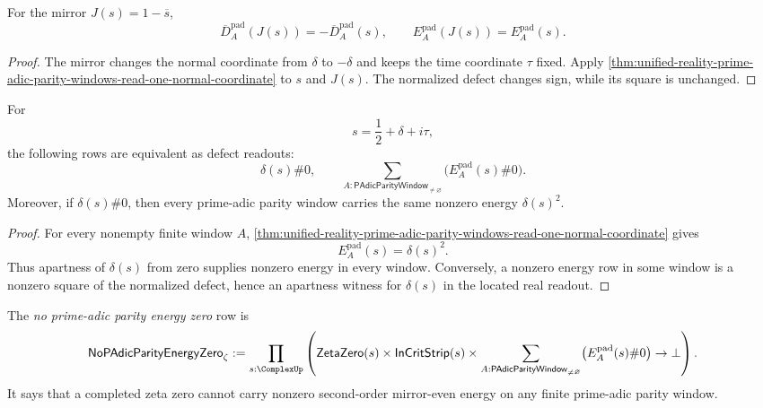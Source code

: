 \begin{corollary}
\label{cor:unified-reality-prime-adic-parity-energy-odd-even}
For the mirror $J(s)=1-\overline{s}$,
$$
\overline D_A^{\mathrm{pad}}(J(s))
=
-\overline D_A^{\mathrm{pad}}(s),
\qquad
E_A^{\mathrm{pad}}(J(s))=E_A^{\mathrm{pad}}(s).
$$
\end{corollary}

\begin{proof}
The mirror changes the normal coordinate from $\delta$ to $-\delta$ and
keeps the time coordinate $\tau$ fixed.  Apply
\autoref{thm:unified-reality-prime-adic-parity-windows-read-one-normal-coordinate}
to $s$ and $J(s)$.  The normalized defect changes sign, while its square
is unchanged.
\end{proof}

\begin{theorem}
\label{thm:unified-reality-noncentrality-finite-window-energy}
For
$$
s=\frac12+\delta+i\tau,
$$
the following rows are equivalent as defect readouts:
$$
\delta(s)\#0,
\qquad
\sum_{A:\mathsf{PAdicParityWindow}_{\ne\varnothing}}
\bigl(E_A^{\mathrm{pad}}(s)\#0\bigr).
$$
Moreover, if $\delta(s)\#0$, then every prime-adic parity window carries
the same nonzero energy $\delta(s)^2$.
\end{theorem}

\begin{proof}
For every nonempty finite window $A$,
\autoref{thm:unified-reality-prime-adic-parity-windows-read-one-normal-coordinate}
gives
$$
E_A^{\mathrm{pad}}(s)=\delta(s)^2.
$$
Thus apartness of $\delta(s)$ from zero supplies nonzero energy in every
window.  Conversely, a nonzero energy row in some window is a nonzero
square of the normalized defect, hence an apartness witness for
$\delta(s)$ in the located real readout.
\end{proof}

\begin{definition}
\label{def:unified-reality-no-prime-adic-parity-energy-zero}
The \emph{no prime-adic parity energy zero} row is
$$
\mathsf{NoPAdicParityEnergyZero}_{\zeta}
:=
\prod_{s:\ComplexUp}
\left(
\mathsf{ZetaZero}(s)
\times
\mathsf{InCritStrip}(s)
\times
\sum_{A:\mathsf{PAdicParityWindow}_{\ne\varnothing}}
\bigl(E_A^{\mathrm{pad}}(s)\#0\bigr)
\to
\bot
\right).
$$
It says that a completed zeta zero cannot carry nonzero second-order
mirror-even energy on any finite prime-adic parity window.
\end{definition}

